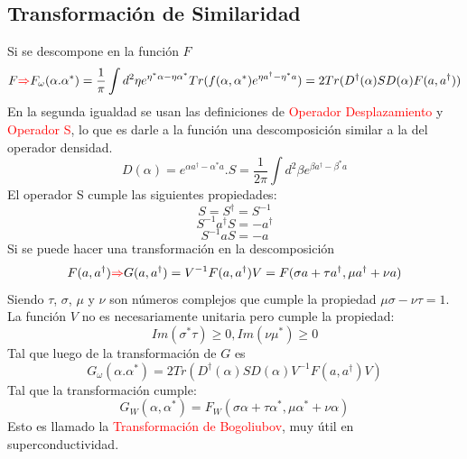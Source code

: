 \documentclass{book}
\begin{document}
\subsection{Transformación de Similaridad}
Si se descompone en la función $F$
\begin{equation}\label{eq6.15}F \textcolor{red}{\Rightarrow} F_\omega(\alpha.\alpha^*)=\frac{1}{\pi}\int d^2\eta e^{\eta^*\alpha-\eta\alpha^*}Tr(f(\alpha,\alpha^*)e^{\eta a^\dag-\eta^* a})=2Tr(D^\dag(\alpha)SD(\alpha)F(a,a^\dag))\end{equation}
En la segunda igualdad se usan las definiciones de \textcolor{red}{Operador Desplazamiento} y \textcolor{red}{Operador S}, lo que es darle a la función una descomposición similar a la del operador densidad. \begin{equation}\label{eq6.16}D(\alpha)=e^{\alpha a^\dag-\alpha^* a}. S=\frac{1}{2\pi}\int d^2\beta e^{\beta a^\dag-\beta^* a}\end{equation}
El operador S cumple las siguientes propiedades:
\begin{equation}\label{eq6.17}S=S^\dag=S^{-1}\end{equation}
\begin{equation}\label{eq6.18}S^{-1}a^\dag S=-a^\dag\end{equation}
\begin{equation}\label{eq6.19}S^{-1}aS=-a\end{equation}
Si se puede hacer una transformación en la descomposición 
\begin{equation}\label{eq6.20}F(a,a^\dag)\textcolor{red}{\Rightarrow}G(a,a^\dag)=V^{-1}F(a,a^\dag)V=F(\sigma a+\tau a^\dag,\mu a^\dag+\nu a)\end{equation}
Siendo $\tau$, $\sigma$, $\mu$ y $\nu$ son números complejos que cumple la propiedad $ \mu\sigma-\nu\tau=1$. La función $V$ no es necesariamente unitaria pero cumple la propiedad:
\begin{equation}\label{eq6.21}Im(\sigma^* \tau)\geq 0, Im(\nu\mu^*)\geq 0\end{equation}
Tal que luego de la transformación de $G$ es
\begin{equation}\label{eq6.22} G_\omega(\alpha.\alpha^*)=2Tr(D^\dag(\alpha)SD(\alpha)V^{-1}F(a,a^\dag)V)\end{equation}
Tal que la transformación cumple:
\begin{equation}\label{eq6.23}G_W(\alpha,\alpha^*)=F_W(\sigma \alpha+\tau \alpha^*,\mu \alpha^*+\nu \alpha)\end{equation}
Esto es llamado la \textcolor{red}{Transformación de Bogoliubov}, muy útil en superconductividad.
\end{document}
